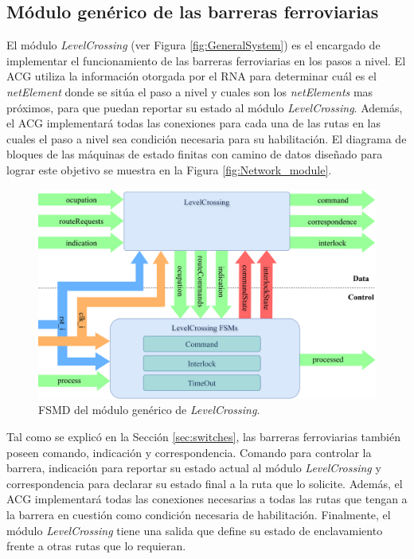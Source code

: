 \subsection{Módulo genérico de las barreras ferroviarias}
	\label{sec:ACG_lc}
	
	El módulo \textit{LevelCrossing} (ver Figura \ref{fig:GeneralSystem}) es el encargado de implementar el funcionamiento de las barreras ferroviarias en los pasos a nivel. El ACG utiliza la información otorgada por el RNA para determinar cuál es el \textit{netElement} donde se sitúa el paso a nivel y cuales son los \textit{netElements} mas próximos, para que puedan reportar su estado al módulo \textit{LevelCrossing}. Además, el ACG implementará todas las conexiones para cada una de las rutas en las cuales el paso a nivel sea condición necesaria para su habilitación. El diagrama de bloques de las máquinas de estado finitas con camino de datos diseñado para lograr este objetivo se muestra en la Figura \ref{fig:Network_module}.
	
	\begin{figure}[H]
		\centering
		\includegraphics[width=1\textwidth]{Figuras/LCB_module}
		\centering\caption{FSMD del módulo genérico de \textit{LevelCrossing}.}
		\label{fig:LCB_module}
	\end{figure}
	
	Tal como se explicó en la Sección \ref{sec:switches}, las barreras ferroviarias también poseen comando, indicación y correspondencia. Comando para controlar la barrera, indicación para reportar su estado actual al módulo \textit{LevelCrossing} y correspondencia para declarar su estado final a la ruta que lo solicite. Además, el ACG implementará todas las conexiones necesarias a todas las rutas que tengan a la barrera en cuestión como condición necesaria de habilitación. Finalmente, el módulo \textit{LevelCrossing} tiene una salida que define su estado de enclavamiento frente a otras rutas que lo requieran.
	
